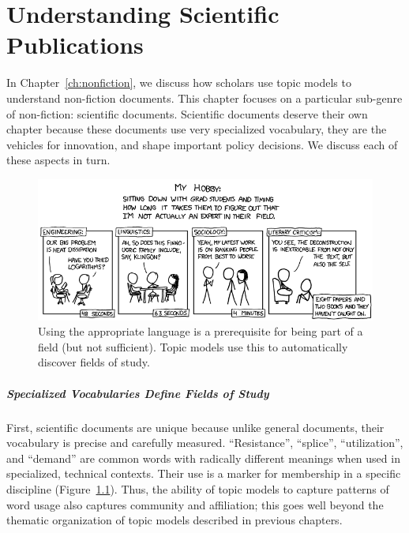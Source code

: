 

\chapter{Understanding Scientific Publications}
\label{ch:sci}

In Chapter~\ref{ch:nonfiction}, we discuss how scholars use topic models to understand
non-fiction documents.  This chapter focuses on a particular sub-genre of
non-fiction: scientific documents.  Scientific documents deserve their own
chapter because these documents use very specialized
vocabulary, they are the vehicles for innovation, and shape important
policy decisions.  We discuss each of these aspects in turn.

\begin{figure}
\includegraphics[width=\linewidth]{figures/sci_faking}
\caption{Using the appropriate language is a prerequisite for being
  part of a field (but not sufficient).  Topic models use this to
  automatically discover fields of study.}
\label{fig:faking}
\end{figure}

\paragraph{Specialized Vocabularies Define Fields of Study}

First, scientific documents are unique because unlike general documents,
their vocabulary is precise and carefully measured.  ``Resistance'', ``splice'',
``utilization'', and ``demand'' are common words with radically different
meanings when used in specialized, technical contexts.  Their use is a
marker for membership in a specific discipline
(Figure~\ref{fig:faking}).  Thus, the ability of topic models to capture
patterns of word usage also captures community and affiliation; this goes well
beyond the thematic organization of topic models described in previous chapters.


